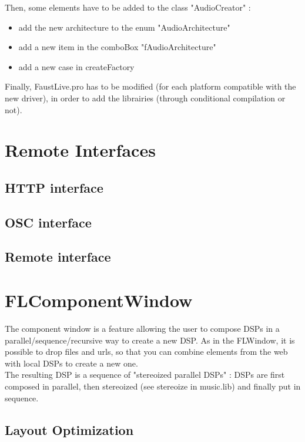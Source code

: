 \documentclass[a4paper]{article}
\begin{document}
{Then, some elements have to be added to the class "AudioCreator" : 
\begin{itemize}
\item add the new architecture to the enum "AudioArchitecture"
\item add a new item in the comboBox "fAudioArchitecture"
\item add a new case in createFactory
\end{itemize}

Finally, FaustLive.pro has to be modified (for each platform compatible with the new driver), in order to add the librairies (through conditional compilation or not).

\section{Remote Interfaces}
\subsection{HTTP interface}
\subsection{OSC interface}
\subsection{Remote interface}

\section{FLComponentWindow}

The component window is a feature allowing the user to compose DSPs in a parallel/sequence/recursive way to create a new DSP. 
As in the FLWindow, it is possible to drop files and urls, so that you can combine elements from the web with local DSPs to create a new one. \\ 

The resulting DSP is a sequence of "stereoized parallel DSPs" : DSPs are first composed in parallel, then stereoized (see stereoize in music.lib) and finally put in sequence. \\

\subsection{Layout Optimization}

}
\end{document}
